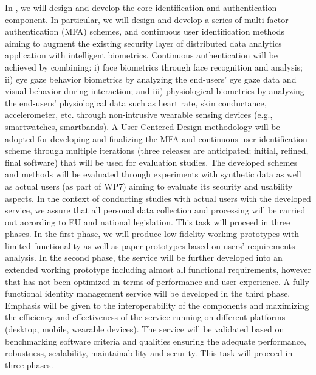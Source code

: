 \begin{Workpackage}{\thewpno}
\begin{Task}
In \theTask, we will design and develop the core identification and authentication component. In particular, we will design and develop a series of multi-factor authentication (MFA) schemes, and continuous user identification methods aiming to augment the existing security layer of distributed data analytics application with intelligent biometrics. Continuous authentication will be achieved by combining: i) face biometrics through face recognition and analysis; ii) eye gaze behavior biometrics by analyzing the end-users' eye gaze data and visual behavior during interaction; and iii) physiological biometrics by analyzing the end-users' physiological data such as heart rate, skin conductance, accelerometer, etc. through non-intrusive wearable sensing devices (e.g., smartwatches, smartbands). A User-Centered Design methodology will be adopted for developing and finalizing the MFA and continuous user identification scheme through multiple iterations (three releases are anticipated; initial, refined, final software) that will be used for evaluation studies. The developed schemes and methods will be evaluated through experiments with synthetic data as well as actual users (as part of WP7) aiming to evaluate its security and usability aspects. In the context of conducting studies with actual users with the developed service, we assure that all personal data collection and processing will be carried out according to EU and national legislation. This task will proceed in three phases. In the first phase, we will produce low-fidelity working prototypes with limited functionality as well as paper prototypes based on users’ requirements analysis. In the second phase, the service will be further developed into an extended working prototype including almost all functional requirements, however that has not been optimized in terms of performance and user experience. A fully functional identity management service will be developed in the third phase. Emphasis will be given to the interoperability of the components and maximizing the efficiency and effectiveness of the service running on different platforms (desktop, mobile, wearable devices). The service will be validated based on benchmarking software criteria and qualities ensuring the adequate performance, robustness, scalability, maintainability and security. This task will proceed in three phases. 
\end{Task}

\begin{Task}


\end{Task}
\end{Workpackage}
